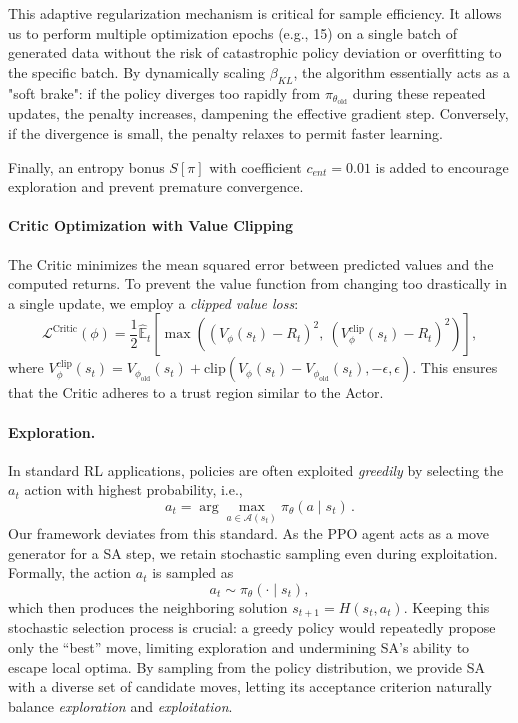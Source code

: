 \documentclass[letterpaper]{article} %
\begin{document}
This adaptive regularization mechanism is critical for sample efficiency. It allows us to perform multiple optimization epochs (e.g., 15) on a single batch of generated data without the risk of catastrophic policy deviation or overfitting to the specific batch. By dynamically scaling $\beta_{KL}$, the algorithm essentially acts as a "soft brake": if the policy diverges too rapidly from $\pi_{\theta_{\text{old}}}$ during these repeated updates, the penalty increases, dampening the effective gradient step. Conversely, if the divergence is small, the penalty relaxes to permit faster learning.


Finally, an entropy bonus $S[\pi]$ with coefficient $c_{ent}=0.01$ is added to encourage exploration and prevent premature convergence.

\paragraph{Critic Optimization with Value Clipping}
The Critic minimizes the mean squared error between predicted values and the computed returns. To prevent the value function from changing too drastically in a single update, we employ a \textit{clipped value loss}:
\begin{equation}
    \mathcal{L}^{\text{Critic}}(\phi) = \frac{1}{2} \hat{\mathbb{E}}_t \left[ \max \left( (V_{\phi}(s_t) - R_t)^2, \ (V_{\phi}^{\text{clip}}(s_t) - R_t)^2 \right) \right],
\end{equation}
where $V_{\phi}^{\text{clip}}(s_t) = V_{\phi_{\text{old}}}(s_t) + \text{clip}(V_{\phi}(s_t) - V_{\phi_{\text{old}}}(s_t), -\epsilon, \epsilon)$. This ensures that the Critic adheres to a trust region similar to the Actor.

\paragraph{Exploration.}

In standard RL applications, policies are often exploited \textit{greedily} by selecting the $a_t$ action with highest probability, i.e.,
$$
a_t = \arg \max_{a \in \mathcal{A}(s_t)} \pi_{\theta}(a \mid s_t) \,.
$$
Our framework deviates from this standard. As the PPO agent acts as a move generator for a SA step, we retain stochastic sampling even during exploitation. Formally, the action $a_t$ is sampled as
\begin{equation*}
a_t \sim \pi_{\theta}(\cdot \mid s_t),
\end{equation*}
which then produces the neighboring solution $s_{t+1} = H(s_t, a_t)$. 
Keeping this stochastic selection process is crucial: a greedy policy would repeatedly propose only the ``best'' move, limiting exploration and undermining SA's ability to escape local optima. By sampling from the policy distribution, we provide SA with a diverse set of candidate moves, letting its acceptance criterion naturally balance \textit{exploration} and \textit{exploitation}.
\end{document}
